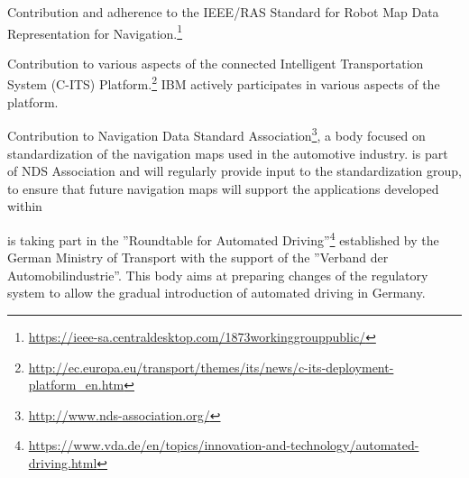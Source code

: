 \begin{denseItemize}
\item Contribution and adherence to the IEEE/RAS Standard for Robot Map Data Representation for Navigation.\footnote{\url{https://ieee-sa.centraldesktop.com/1873workinggrouppublic/}}
\item Contribution to various aspects of the connected Intelligent Transportation System (C-ITS) Platform.\footnote{\url{http://ec.europa.eu/transport/themes/its/news/c-its-deployment-platform_en.htm}} IBM actively participates in various aspects of the platform.
\item Contribution to Navigation Data Standard Association\footnote{\url{http://www.nds-association.org/}}, a body focused on standardization of the navigation maps used in the automotive industry. \VW is part of NDS Association and will regularly provide input to the standardization group, to ensure that future navigation maps will support the applications developed within \Project
\item \VW is taking part in the ''Roundtable for Automated Driving''\footnote{\url{https://www.vda.de/en/topics/innovation-and-technology/automated-driving.html}} established by the German Ministry of Transport with the support of the ''Verband der Automobilindustrie''. This body aims at preparing changes of the regulatory system to allow the gradual introduction of automated driving in Germany.
\end{denseItemize}



